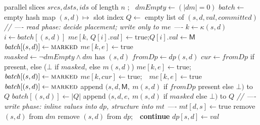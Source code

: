 \documentclass[11pt,a4paper]{article}
\theoremstyle{plain}
\theoremstyle{definition}
\theoremstyle{remark}
\newcommand{\M}{\mathsf{M}}
\begin{document}
\begin{algorithm}[!ht]
\small
\caption{\textsc{SetAllFromSlices}: bulk insert with in-batch promotion}
\label{alg:insert}
\begin{algorithmic}[1]
\Require parallel slices $\mathit{srcs}, \mathit{dsts}, \mathit{ids}$ of length $n$
\State {}; \ $\mathit{dmEmpty} \gets (|dm| = 0)$
\State $\mathit{batch} \gets$ empty hash map $(s,d) \mapsto$ slot index
\State $Q \gets$ empty list of $(s, d, \mathit{val}, \mathit{committed})$ 
\Statex \textit{// ---- read phase: decide placement; write only to $me$ ----}
  \State $k \gets \kappa(s,d)$
    \State $i \gets \mathit{batch}[(s,d)]$
     
      \State $me[k,\, Q[i].\mathit{val}] \gets \mathrm{true}$;\quad $Q[i].\mathit{val} \gets \M$
      \State $\mathit{batch}[(s,d)] \gets \textsc{marked}$
    \EndIf
    \State $me[k,e] \gets \mathrm{true}$
  \Else
    \State $\mathit{masked} \gets \lnot \mathit{dmEmpty} \wedge dm \text{ has } (s,d)$
    \State $\mathit{fromDp} \gets dp(s,d)$
    \State $\mathit{cur} \gets \mathit{fromDp}$ if present, else ($\bot$ if $\mathit{masked}$, else $m(s,d)$)
    \If{$\mathit{cur} = \M$} 
      \State $me[k,e] \gets \mathrm{true}$;\ \ $\mathit{batch}[(s,d)] \gets \textsc{marked}$
     
      \State $me[k, \mathit{cur}] \gets \mathrm{true}$;\ \ $me[k,e] \gets \mathrm{true}$
      \State $\mathit{batch}[(s,d)] \gets \textsc{marked}$
      \State append $(s,d,\M,\ m(s,d)$ if $\mathit{fromDp}$ present else $\bot)$ to $Q$
    \Else {}
      \State $\mathit{batch}[(s,d)] \gets |Q|$
      \State append $(s,d,e,\ m(s,d)$ if $\mathit{masked}$ else $\bot)$ to $Q$
    \EndIf
  \EndIf
\EndFor
\Statex \textit{// ---- write phase: inline values into $dp$, structure into $mt$ ----}
  \State $mt[d,s] \gets \mathrm{true}$
    \State remove $(s,d)$ from $dm$ 
      \State remove $(s,d)$ from $dp$;\ \ \textbf{continue}
    \EndIf
  \EndIf
  \State $dp[s,d] \gets \mathit{val}$
\EndFor
\end{algorithmic}
\end{algorithm}
\end{document}
